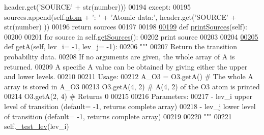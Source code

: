 \begin{DoxyCode}
      header.get(\textcolor{stringliteral}{'SOURCE'} + str(number)))
00194                 \textcolor{keywordflow}{except}:
00195                     sources.append(self.\hyperlink{classpyneb_1_1core_1_1pynebcore_1_1___atom_data_fits_a489ba89fa2e99786afc077e82acace4c}{atom} + \textcolor{stringliteral}{': '} + \textcolor{stringliteral}{'Atomic data:'}, header.get(\textcolor{stringliteral}{'SOURCE'} + str(number)
      ))
00196         \textcolor{keywordflow}{return} sources
00197     
00198     
\hypertarget{pynebcore_8py_source_l00199}{}\hyperlink{classpyneb_1_1core_1_1pynebcore_1_1___atom_data_fits_a7307e0d4863dc562369df1b7e6d5ac1b}{00199}     \textcolor{keyword}{def }\hyperlink{classpyneb_1_1core_1_1pynebcore_1_1___atom_data_fits_a7307e0d4863dc562369df1b7e6d5ac1b}{printSources}(self):
00200         
00201         \textcolor{keywordflow}{for} source \textcolor{keywordflow}{in} self.\hyperlink{classpyneb_1_1core_1_1pynebcore_1_1___atom_data_fits_a798f0a704adc5f8de86ea22cbd40fb81}{getSources}():
00202             \textcolor{keywordflow}{print} source    
00203 
00204     
\hypertarget{pynebcore_8py_source_l00205}{}\hyperlink{classpyneb_1_1core_1_1pynebcore_1_1___atom_data_fits_a4ecca5287d3b6bf0d6e44b9bb184db77}{00205}     \textcolor{keyword}{def }\hyperlink{classpyneb_1_1core_1_1pynebcore_1_1___atom_data_fits_a4ecca5287d3b6bf0d6e44b9bb184db77}{getA}(self, lev\_i= -1, lev\_j= -1):
00206         \textcolor{stringliteral}{"""}
00207 \textcolor{stringliteral}{        Return the transition probability data. }
00208 \textcolor{stringliteral}{        If no arguments are given, the whole array of A is returned.}
00209 \textcolor{stringliteral}{        A specific A value can be obtained by giving either the upper and lower levels.}
00210 \textcolor{stringliteral}{            }
00211 \textcolor{stringliteral}{        Usage:}
00212 \textcolor{stringliteral}{            A\_O3 = O3.getA()          # The whole A array is stored in A\_O3}
00213 \textcolor{stringliteral}{            O3.getA(4, 2)      # A(4, 2) of the O3 atom is printed}
00214 \textcolor{stringliteral}{            O3.getA(2, 4)      # Returns 0}
00215 \textcolor{stringliteral}{}
00216 \textcolor{stringliteral}{        Parameters:}
00217 \textcolor{stringliteral}{            - lev\_i  upper level of transition (default= -1, returns complete array)}
00218 \textcolor{stringliteral}{            - lev\_j  lower level of transition (default= -1, returns complete array)}
00219 \textcolor{stringliteral}{            }
00220 \textcolor{stringliteral}{        """}
00221         self.\hyperlink{classpyneb_1_1core_1_1pynebcore_1_1___atom_data_fits_ae83c63a7bd651275de23e5f17ddcf999}{\_test\_lev}(lev\_i)

\end{DoxyCode}

